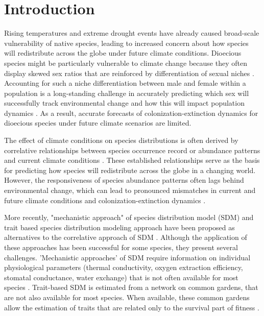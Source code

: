 \documentclass[11pt]{article}
\begin{document}
\section*{Introduction}
Rising temperatures and extreme drought events have already caused broad-scale vulnerability of native species, leading to increased concern about how species will redistribute across the globe under future climate conditions.
Dioecious species might be particularly vulnerable to climate change because they often display skewed sex ratios that are reinforced by differentiation of sexual niches \citep{Tognetti2012}. 
Accounting for such a niche differentiation between male and female within a population is a long-standing challenge in accurately predicting which sex will successfully track environmental change and how this will impact population dynamics \citep{jones1999sex}. 
As a result, accurate forecasts of colonization-extinction dynamics for dioecious species under future climate scenarios are  limited.

The effect of climate conditions on species distributions is often derived by correlative relationships between species occurrence record or abundance patterns and current climate conditions \citep{elith2009species}.  
These established relationships serve as the basis for predicting how species will redistribute across the globe in a changing world. 
However, the responsiveness of species abundance patterns often lags behind environmental change, which can lead to pronounced mismatches in current and future climate conditions and colonization-extinction dynamics \citep{a2022species}. 
 
More recently, "mechanistic approach" of species distribution model (SDM) and trait based species distribution modeling approach have been proposed as alternatives to the correlative approach of SDM \citep{porter2010modeling,kearney2009mechanistic,benito2019deltatrait}. 
Although the application of these approaches has been successful for some species, they present several challenges.
'Mechanistic approaches' of SDM require information on individual physiological parameters (thermal conductivity, oxygen extraction efficiency, stomatal conductance, water exchange) that is not often available for most species \citep{daley2006interspecific, peterson2015mechanistic}.
Trait-based SDM is estimated from a network on common gardens, that are not also available for most species.
When available, these common gardens allow the estimation of traits that are related only to the survival part of fitness \citep{benito2019deltatrait}. 
\end{document}
